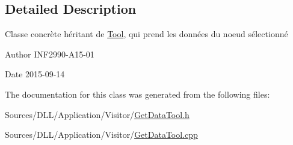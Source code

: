 \subsection{Detailed Description}
Classe concrète héritant de \hyperlink{class_tool}{Tool}, qui prend les données du noeud sélectionné 

\begin{DoxyAuthor}{Author}
I\+N\+F2990-\/\+A15-\/01 
\end{DoxyAuthor}
\begin{DoxyDate}{Date}
2015-\/09-\/14 
\end{DoxyDate}


The documentation for this class was generated from the following files\+:\begin{DoxyCompactItemize}
\item 
Sources/\+D\+L\+L/\+Application/\+Visitor/\hyperlink{_get_data_tool_8h}{Get\+Data\+Tool.\+h}\item 
Sources/\+D\+L\+L/\+Application/\+Visitor/\hyperlink{_get_data_tool_8cpp}{Get\+Data\+Tool.\+cpp}\end{DoxyCompactItemize}

